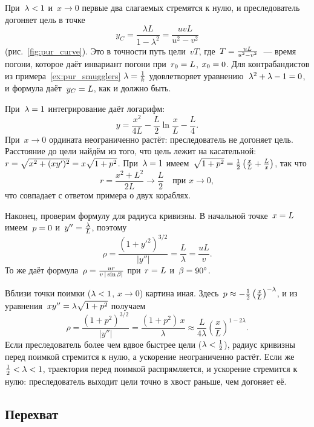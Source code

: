 \documentclass[../main.tex]{subfiles}
\begin{document}
При~$\lambda <\nobreak 1$ и~$x \to 0$ первые два слагаемых стремятся к нулю, и
преследователь догоняет цель в точке
\[
y_C = \frac{\lambda L}{1 - \lambda^2} = \frac{uvL}{u^2 - v^2}
\]
(рис.~\ref{fig:pur_curve}). Это в точности путь цели~$vT$, где~$T \hm= \frac{uL}{u^2 - v^2}$~---
время погони, которое даёт инвариант погони при~$r_0 \hm= L$, $x_0 \hm= 0$. Для
контрабандистов из примера~\ref{ex:pur_smugglers} $\lambda \hm= \frac{1}{k}$
удовлетворяет уравнению~$\lambda^2 + \lambda - 1 \hm= 0$, и формула даёт~$y_C \hm= L$,
как и должно быть.

При~$\lambda \hm= 1$ интегрирование даёт логарифм:
\[
y = \frac{x^2}{4L} - \frac{L}{2}\ln\frac{x}{L} - \frac{L}{4}.
\]
При~$x \to 0$ ордината неограниченно растёт: преследователь не догоняет цель.
Расстояние до цели найдём из того, что цель лежит на касательной:
$r \hm= \sqrt{x^2 + (xy')^2} \hm= x\sqrt{1 + p^2}$. При~$\lambda \hm= 1$ имеем~$\sqrt{1 + p^2} \hm= \frac{1}{2}\left(\frac{x}{L} + \frac{L}{x}\right)$, так что
\[
r = \frac{x^2 + L^2}{2L} \to \frac{L}{2} \quad\text{при } x \to 0,
\]
что совпадает с ответом примера о двух кораблях.

Наконец, проверим формулу для радиуса кривизны. В начальной точке~$x \hm= L$ имеем~$p \hm= 0$ и~$y'' \hm= \frac{\lambda}{L}$, поэтому
\[
\rho = \frac{(1 + y'^2)^{3/2}}{|y''|} = \frac{L}{\lambda} = \frac{uL}{v}.
\]
То же даёт формула~$\rho \hm= \frac{ur}{v\,|\sin\beta|}$ при~$r \hm= L$ и~$\beta \hm= 90^\circ$.

Вблизи точки поимки ($\lambda <\nobreak 1$, $x \to 0$) картина иная. Здесь~$p \hm\approx -\frac{1}{2}\left(\frac{x}{L}\right)^{-\lambda}$, и из уравнения~$xy'' \hm= \lambda\sqrt{1 + p^2}$ получаем
\[
\rho = \frac{(1 + p^2)^{3/2}}{|y''|} = \frac{(1 + p^2)\,x}{\lambda}
\approx \frac{L}{4\lambda}\left(\frac{x}{L}\right)^{1 - 2\lambda}.
\]
Если преследователь более чем вдвое быстрее цели ($\lambda <\nobreak \frac{1}{2}$), радиус
кривизны перед поимкой стремится к нулю, а ускорение неограниченно растёт. Если же~$\frac{1}{2} <\nobreak \lambda <\nobreak 1$, траектория перед поимкой распрямляется, и ускорение
стремится к нулю: преследователь выходит цели точно в хвост раньше, чем догоняет её.

\subsection{Перехват}
\end{document}
